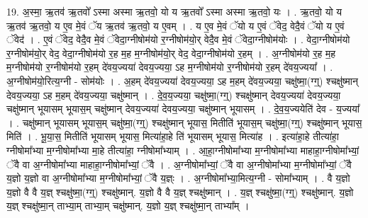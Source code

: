 \documentclass[17pt]{extarticle}
\begin{document}
19. अ॒स्मा॒ ऋ॒तव॑ ऋ॒तवो᳚ ऽस्मा अस्मा ऋ॒तवो॒ यो य ऋ॒तवो᳚ ऽस्मा अस्मा ऋ॒तवो॒ यः । . ऋ॒तवो॒ यो य ऋ॒तव॑ ऋ॒तवो॒ य ए॒व मे॒वं ॅय ऋ॒तव॑ ऋ॒तवो॒ य ए॒वम् । . य ए॒व मे॒वं ॅयो य ए॒वं ॅवेद॒ वेदै॒वं ॅयो य ए॒वं ॅवेद॑ । . ए॒वं ॅवेद॒ वेदै॒व मे॒वं ॅवेदा॒ग्नीषोम॑यो र॒ग्नीषोम॑यो॒र् वेदै॒व मे॒वं ॅवेदा॒ग्नीषोम॑योः । . वेदा॒ग्नीषोम॑यो र॒ग्नीषोम॑यो॒र् वेद॒ वेदा॒ग्नीषोम॑यो र॒ह म॒ह म॒ग्नीषोम॑यो॒र् वेद॒ वेदा॒ग्नीषोम॑यो र॒हम् । . अ॒ग्नीषोम॑यो र॒ह म॒ह म॒ग्नीषोम॑यो र॒ग्नीषोम॑यो र॒हम् दे॑वय॒ज्यया॑ देवय॒ज्यया॒ ऽह म॒ग्नीषोम॑यो र॒ग्नीषोम॑यो र॒हम् दे॑वय॒ज्यया᳚ । . अ॒ग्नीषोम॑यो॒रित्य॒ग्नी - सोम॑योः । . अ॒हम् दे॑वय॒ज्यया॑ देवय॒ज्यया॒ ऽह म॒हम् दे॑वय॒ज्यया॒ चक्षु॑ष्मा॒(ग्ग्॒) श्चक्षु॑ष्मान् देवय॒ज्यया॒ ऽह म॒हम् दे॑वय॒ज्यया॒ चक्षु॑ष्मान् । . दे॒व॒य॒ज्यया॒ चक्षु॑ष्मा॒(ग्ग्॒) श्चक्षु॑ष्मान् देवय॒ज्यया॑ देवय॒ज्यया॒ चक्षु॑ष्मान् भूयासम् भूयास॒म् चक्षु॑ष्मान् देवय॒ज्यया॑ देवय॒ज्यया॒ चक्षु॑ष्मान् भूयासम् । . दे॒व॒य॒ज्ययेति॑ देव - य॒ज्यया᳚ । . चक्षु॑ष्मान् भूयासम् भूयास॒म् चक्षु॑ष्मा॒(ग्ग्॒) श्चक्षु॑ष्मान् भूयास॒ मितीति॑ भूयास॒म् चक्षु॑ष्मा॒(ग्ग्॒) श्चक्षु॑ष्मान् भूयास॒ मिति॑ । . भू॒या॒स॒ मितीति॑ भूयासम् भूयास॒ मित्या॑हा॒हे ति॑ भूयासम् भूयास॒ मित्या॑ह । . इत्या॑हा॒हे तीत्या॑हा॒ ग्नीषोमा᳚भ्या म॒ग्नीषोमा᳚भ्या मा॒हे तीत्या॑हा॒ ग्नीषोमा᳚भ्याम् । . आ॒हा॒ग्नीषोमा᳚भ्या म॒ग्नीषोमा᳚भ्या माहाहा॒ग्नीषोमा᳚भ्यां॒ ॅवै वा अ॒ग्नीषोमा᳚भ्या माहाहा॒ग्नीषोमा᳚भ्यां॒ ॅवै । . अ॒ग्नीषोमा᳚भ्यां॒ ॅवै वा अ॒ग्नीषोमा᳚भ्या म॒ग्नीषोमा᳚भ्यां॒ ॅवै य॒ज्ञो य॒ज्ञो वा अ॒ग्नीषोमा᳚भ्या म॒ग्नीषोमा᳚भ्यां॒ ॅवै य॒ज्ञ्ः । . अ॒ग्नीषोमा᳚भ्या॒मित्य॒ग्नी - सोमा᳚भ्याम् । . वै य॒ज्ञो य॒ज्ञो वै वै य॒ज्ञ् श्चक्षु॑ष्मा॒(ग्ग्॒) श्चक्षु॑ष्मान्. य॒ज्ञो वै वै य॒ज्ञ् श्चक्षु॑ष्मान् । . य॒ज्ञ् श्चक्षु॑ष्मा॒(ग्ग्॒) श्चक्षु॑ष्मान्. य॒ज्ञो य॒ज्ञ् श्चक्षु॑ष्मा॒न् ताभ्या॒म् ताभ्या॒म् चक्षु॑ष्मान्. य॒ज्ञो य॒ज्ञ् श्चक्षु॑ष्मा॒न् ताभ्या᳚म् । \newline
\end{document}
